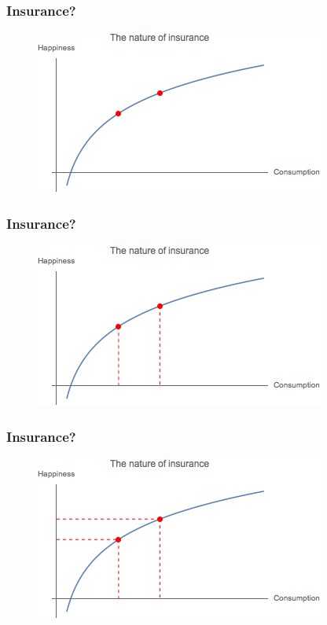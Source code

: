 \documentclass{beamer}
\begin{document}
\begin{frame}
\frametitle{Insurance?}
\begin{figure}
\centering
\includegraphics[scale=0.8]{Figures/Insurance_1.png}
\end{figure}
\end{frame}

\begin{frame}
\frametitle{Insurance?}
\begin{figure}
\centering
\includegraphics[scale=0.8]{Figures/Insurance_2.png}
\end{figure}
\end{frame}

\begin{frame}
\frametitle{Insurance?}
\begin{figure}
\centering
\includegraphics[scale=0.8]{Figures/Insurance_3.png}
\end{figure}
\end{frame}
\end{document}
